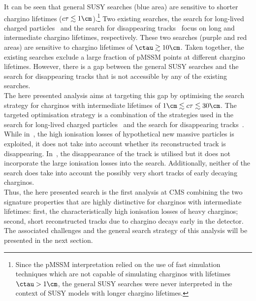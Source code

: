 It can be seen that general SUSY searches (blue area) are sensitive to shorter chargino lifetimes ($c\tau \lesssim 1\cm$).\footnote{Since the pMSSM interpretation relied on the use of fast simulation techniques which are not capable of simulating charginos with lifetimes $\ctau>1\cm$, the general SUSY searches were never interpreted in the context of SUSY models with longer chargino lifetimes.} 
Two existing searches, the search for long-lived charged particles~\cite{bib:CMS:HSCP_8TeV} and the search for disappearing tracks~\cite{bib:CMS:DT_8TeV} focus on long and intermediate chargino lifetimes, respectively. 
These two searches (purple and red areas) are sensitive to chargino lifetimes of $\ctau \gtrsim 10\cm$.
Taken together, the existing searches exclude a large fraction of pMSSM points at different chargino lifetimes. 
However, there is a gap between the general SUSY searches and the search for disappearing tracks that is not accessible by any of the existing searches.\\

The here presented analysis aims at targeting this gap by optimising the search strategy for charginos with intermediate lifetimes of $1\cm \lesssim c\tau \lesssim 30\cm$. 
The targeted optimisation strategy is a combination of the strategies used in the search for long-lived charged particles~\cite{bib:CMS:HSCP_8TeV} and the search for disappearing tracks~\cite{bib:CMS:DT_8TeV}.
While in~\cite{bib:CMS:HSCP_8TeV}, the high ionisation losses of hypothetical new massive particles is exploited, it does not take into account whether its reconstructed track is disappearing.
In~\cite{bib:CMS:DT_8TeV}, the disappearance of the track is utilised but it does not incorporate the large ionisation losses into the search.
Additionally, neither of the search does take into account the possibly very short tracks of early decaying charginos.\\

Thus, the here presented search is the first analysis at CMS combining the two signature properties that are highly distinctive for charginos with intermediate lifetimes: 
first, the characteristically high ionisation losses of heavy charginos;
second, short reconstructed tracks due to chargino decays early in the detector. \\

The associated challenges and the general search strategy of this analysis will be presented in the next section.


